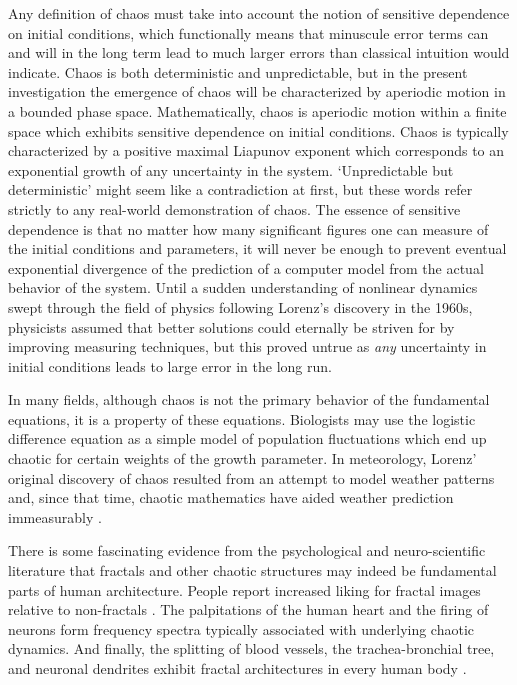 \documentclass[12pt,twoside]{reedthesis}
\begin{document}
Any definition of chaos must take into account the notion of sensitive dependence on initial conditions, which functionally means that minuscule error terms can and will in the long term lead to much larger errors than classical intuition would indicate.  Chaos is both deterministic and unpredictable, but in the present investigation the emergence of chaos will be characterized by aperiodic motion in a bounded phase space.  Mathematically, chaos is aperiodic motion within a finite space which exhibits sensitive dependence on initial conditions.  Chaos is typically characterized by a positive maximal Liapunov exponent which corresponds to an exponential growth of any uncertainty in the system.  `Unpredictable but deterministic' might seem like a contradiction at first, but these words refer strictly to any real-world demonstration of chaos.  
	The essence of sensitive dependence is that no matter how many significant figures one can measure of the initial conditions and parameters, it will never be enough to prevent eventual exponential divergence of the prediction of a computer model from the actual behavior of the system.  Until a sudden understanding of nonlinear dynamics swept through the field of physics following Lorenz's discovery in the 1960s, physicists assumed that better solutions could eternally be striven for by improving measuring techniques, but this proved untrue as \textit{any} uncertainty in initial conditions leads to large error in the long run.  


In many fields, although chaos is not the primary behavior of the fundamental equations, it is a property of these equations.  Biologists may use the logistic difference equation as a simple model of population fluctuations which end up chaotic for certain weights of the growth parameter.  In meteorology, Lorenz' original discovery of chaos resulted from an attempt to model weather patterns and, since that time, chaotic mathematics have aided weather prediction immeasurably \cite{pethkar2001}.

There is some fascinating evidence from the psychological and neuro-scientific literature that fractals and other chaotic structures may indeed be fundamental parts of human architecture.   People report increased liking for fractal images relative to non-fractals \cite{sephar2003}.  The palpitations of the human heart and the firing of neurons form frequency spectra typically associated with underlying chaotic dynamics.  And finally, the splitting of blood vessels, the trachea-bronchial tree, and neuronal dendrites exhibit fractal architectures in every human body \cite{nato1987}.
\end{document}
